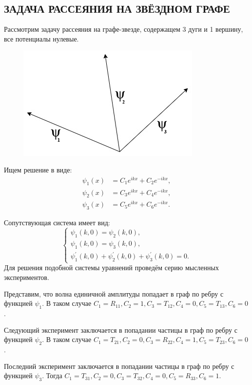 \documentclass[a4 paper, 12 pt]{extarticle}
\begin{document}
  \subsection{ЗАДАЧА РАССЕЯНИЯ НА ЗВЁЗДНОМ ГРАФЕ}
  Рассмотрим задачу рассеяния на графе-звезде, содержащем 3 дуги и 1 вершину, все потенциалы нулевые.
  \begin{figure}[!htb]
  	\centering
  	\includegraphics[scale=0.5]{star.jpg}
  \end{figure}
  Ищем решение в виде:
  \[\begin{split}
  \psi_1\left(x\right) &= C_1 e^{ikx} + C_2 e^{-ikx}, \\
  \psi_2\left(x\right) &= C_3 e^{ikx} + C_4 e^{-ikx}, \\
  \psi_3\left(x\right) &= C_5 e^{ikx} + C_6 e^{-ikx}.
  \end{split}\]
  
  Сопутствующая система имеет вид:
  \[\begin{cases}
  \psi_{1}\left(k,0\right)=\psi_2\left(k,0\right), \\
  \psi_{1}\left(k,0\right)=\psi_3\left(k,0\right), \\
  \psi_1^\prime\left(k,0\right)+\psi_2^\prime\left(k,0\right)+\psi_3^\prime\left(k,0\right)=0.
  \end{cases}
  \]
  Для решения подобной системы уравнений проведём серию мысленных экспериментов.
  
  Представим, что волна единичной амплитуды попадает в граф по ребру с функцией $\psi_1$. В таком случае $C_1 = R_{11}, C_2 = 1, C_3 = T_{12}, C_4 = 0, C_5 = T_{13}, C_6 = 0$. 
  
  Следующий эксперимент заключается в попадании частицы в граф по ребру с функцией $\psi_2$. В таком случае $C_1 = T_{21}, C_2 = 0, C_3 = R_{22}, C_4 = 1, C_5 = T_{23}, C_6 = 0$.
  
  Последний эксперимент заключается в попадании частицы в граф по ребру с функцией $\psi_3$. Тогда $C_1 = T_{31}, C_2 = 0, C_3 = T_{32}, C_4 = 0, C_5 = R_{33}, C_6 = 1$.
  
\end{document}
